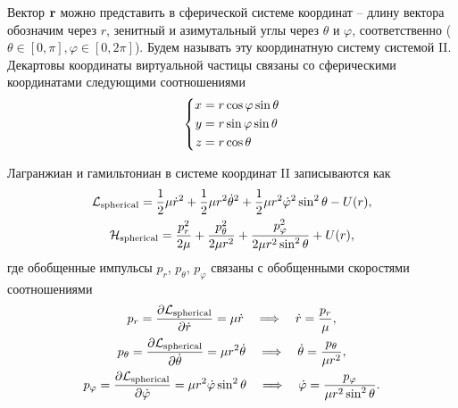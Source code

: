 Вектор $\mathbf{r}$ можно представить в сферической системе координат -- длину вектора обозначим через $r$, зенитный и азимутальный углы через $\theta$ и $\varphi$, соответственно ($\theta \in [0, \pi], \varphi \in [0, 2 \pi]$). Будем называть эту координатную систему системой II. Декартовы координаты виртуальной частицы связаны со сферическими координатами следующими соотношениями
\begin{gather}
    \left\{
    \begin{aligned}
        x &= r \cos \varphi \sin \theta \\
        y &= r \sin \varphi \sin \theta \\
        z &= r \cos \theta
    \end{aligned}
    \right. \label{two-atom-spherical-coordinates}
\end{gather}

Лагранжиан и гамильтониан в системе координат II записываются как
\begin{gather}
    \mathcal{L}_\text{spherical} = \frac{1}{2} \mu \dot{r}^2 + \frac{1}{2} \mu r^2 \dot{\theta}^2 + \frac{1}{2} \mu r^2 \dot{\varphi}^2 \sin^2 \theta - U(r),  \label{two-atom-spherical-lagrangian} \\
    \mathcal{H}_\text{spherical} = \frac{p_r^2}{2 \mu} + \frac{p_\theta^2}{2 \mu r^2} + \frac{p_\varphi^2}{2 \mu r^2 \sin^2 \theta} + U(r), \label{two-atom-spherical-hamiltonian}
\end{gather}
%
где обобщенные импульсы $p_r$, $p_\theta$, $p_\varphi$ связаны с обобщенными скоростями соотношениями
\begin{gather}
    p_r = \frac{\partial \mathcal{L}_\text{spherical}}{\partial \dot{r}} = \mu \dot{r} \quad \Longrightarrow \quad \dot{r} = \frac{p_r}{\mu}, \label{two-atom-spherical-momenta1} \\
    p_\theta = \frac{\partial \mathcal{L}_\text{spherical}}{\partial \dot{\theta}} = \mu r^2 \dot{\theta} \quad \Longrightarrow \quad \dot{\theta} = \frac{p_\theta}{\mu r^2}, \label{two-atom-spherical-momenta2} \\
    p_\varphi = \frac{\partial \mathcal{L}_\text{spherical}}{\partial \dot{\varphi}} = \mu r^2 \dot{\varphi} \sin^2 \theta \quad \Longrightarrow \quad \dot{\varphi} = \frac{p_\varphi}{\mu r^2 \sin^2 \theta}. \label{two-atom-spherical-momenta3}
\end{gather}


